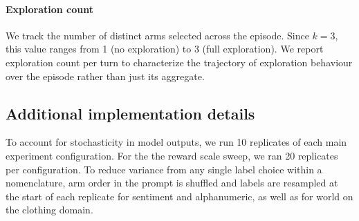 \documentclass{article} %
\begin{document}
\paragraph{Exploration count}
We track the number of distinct arms selected across the episode. Since $k = 3$, this
value ranges from 1 (no exploration) to 3 (full exploration). We report exploration
count per turn to characterize the trajectory of exploration behaviour over the
episode rather than just its aggregate.

\subsection{Additional implementation details}
To account for stochasticity in model outputs, we run 10 replicates of each main experiment configuration. For the the reward scale sweep, we ran 20 replicates per configuration. To reduce variance from any single label choice within a nomenclature, arm order in the prompt is shuffled and labels are resampled at the start of each replicate for sentiment and alphanumeric, as well as for world on the clothing domain.
\end{document}
